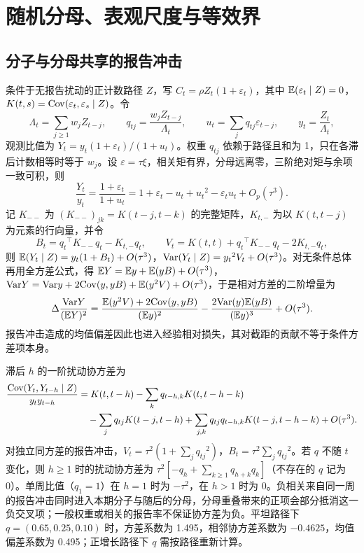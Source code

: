 \section{随机分母、表观尺度与等效界}
\label{app:obs}

\subsection{分子与分母共享的报告冲击}
\label{app:random-denominator}

条件于无报告扰动的正计数路径 $Z$，写 $C_t=\rho Z_t(1+\varepsilon_t)$，其中 $\mathbb{E}(\varepsilon_t\mid Z)=0$，$K(t,s)=\mathrm{Cov}(\varepsilon_t,\varepsilon_s\mid Z)$。令
\begin{equation}
  \Lambda_t=\sum_{j\ge1}w_jZ_{t-j},\qquad
  q_{tj}=\frac{w_jZ_{t-j}}{\Lambda_t},\qquad
  u_t=\sum_jq_{tj}\varepsilon_{t-j},\qquad
  y_t=\frac{Z_t}{\Lambda_t},
\end{equation}
观测比值为 $Y_t=y_t(1+\varepsilon_t)/(1+u_t)$。权重 $q_{tj}$ 依赖于路径且和为 1，只在各滞后计数相等时等于 $w_j$。设 $\varepsilon=\tau\xi$，相关矩有界，分母远离零，三阶绝对矩与余项一致可积，则
\begin{equation}
  \frac{Y_t}{y_t}=\frac{1+\varepsilon_t}{1+u_t}=1+\varepsilon_t-u_t+u_t{}^2-\varepsilon_tu_t+O_p(\tau^3).
\end{equation}
记 $K_{--}$ 为 $(K_{--})_{jk}=K(t-j,t-k)$ 的完整矩阵，$K_{t,-}$ 为以 $K(t,t-j)$ 为元素的行向量，并令
\begin{equation}
  B_t=q_t{}^{\top}K_{--}q_t-K_{t,-}q_t,\qquad
  V_t=K(t,t)+q_t{}^{\top}K_{--}q_t-2K_{t,-}q_t,
\end{equation}
则 $\mathbb{E}(Y_t\mid Z)=y_t(1+B_t)+O(\tau^3)$，$\mathrm{Var}(Y_t\mid Z)=y_t{}^2V_t+O(\tau^3)$。对无条件总体再用全方差公式，得 $\mathbb{E} Y=\mathbb{E} y+\mathbb{E}(yB)+O(\tau^3)$，$\mathrm{Var} Y=\mathrm{Var} y+2\mathrm{Cov}(y,yB)+\mathbb{E}(y^2V)+O(\tau^3)$，于是相对方差的二阶增量为
\begin{equation}
  \Delta\frac{\mathrm{Var} Y}{(\mathbb{E} Y)^2}=\frac{\mathbb{E}(y^2V)+2\mathrm{Cov}(y,yB)}{(\mathbb{E} y)^2}-\frac{2\mathrm{Var}(y)\mathbb{E}(yB)}{(\mathbb{E} y)^3}+O(\tau^3).
  \label{eq:rel-increment}
\end{equation}
报告冲击造成的均值偏差因此也进入经验相对损失，其对截距的贡献不等于条件方差项本身。

滞后 $h$ 的一阶扰动协方差为
\begin{equation}
\begin{aligned}
  \frac{\mathrm{Cov}(Y_t,Y_{t-h}\mid Z)}{y_ty_{t-h}} &= K(t,t-h)-\sum_kq_{t-h,k}K(t,t-h-k) \\
  &\quad -\sum_jq_{tj}K(t-j,t-h)+\sum_{j,k}q_{tj}q_{t-h,k}K(t-j,t-h-k)+O(\tau^3).
\end{aligned}
\end{equation}
对独立同方差的报告冲击，$V_t=\tau^2(1+\sum_jq_{tj}{}^2)$，$B_t=\tau^2\sum_jq_{tj}{}^2$。若 $q$ 不随 $t$ 变化，则 $h\ge1$ 时的扰动协方差为 $\tau^2[-q_h+\sum_{k\ge1}q_{h+k}q_k]$（不存在的 $q$ 记为 0）。单周比值（$q_1=1$）在 $h=1$ 时为 $-\tau^2$，在 $h>1$ 时为 0。负相关来自同一周的报告冲击同时进入本期分子与随后的分母，分母重叠带来的正项会部分抵消这一负交叉项；一般权重或相关的报告率不保证协方差为负。平坦路径下 $q=(0.65,0.25,0.10)$ 时，方差系数为 1.495，相邻协方差系数为 $-0.4625$，均值偏差系数为 0.495；正增长路径下 $q$ 需按路径重新计算。

